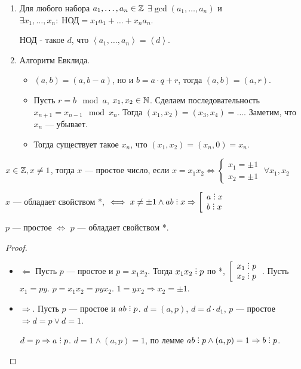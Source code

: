 \begin{enumerate}
    \item Для любого набора $a_1, \ldots, a_n \in \mathbb{Z}$ $\exists \gcd(a_1,\ldots,a_n)$ и $\exists x_1,\ldots,x_n: \; \text{НОД} = x_1a_1 + \ldots + x_n a_n$. 

        НОД - такое $d$, что  $\left< a_1,\ldots,a_n \right> = \left<d\right>$.
    \item Алгоритм Евклида. 
        \begin{itemize}
            \item $(a, b) = (a, b - a)$, но и  $b = a \cdot q + r$, тогда  $(a, b) = (a, r)$.
            
            \item Пусть $r = b \mod a$,  $x_1,x_2 \in \mathbb{N}$. Сделаем последовательность $x_{n+1} = x_{n - 1} \mod x_{n}$. Тогда  $(x_1, x_2) = (x_3, x_4) = \ldots$. Заметим, что $x_n$ --- убывает.

            \item Тогда существует такое  $x_n$, что  $(x_1, x_2) = (x_n, 0) = x_n$.
        \end{itemize}
\end{enumerate}
\begin{definition}
    $x \in \mathbb{Z}, x \neq 1$, тогда  $x$ --- простое число, если $x = x_1x_2 \iff \begin{cases} x_1 = \pm 1 \\ x_2 = \pm 1 \end{cases} \; \forall x_1, x_2$
\end{definition}
\begin{property}[*]
    $x$ --- обладает свойством  *, $\iff x \neq \pm 1 \land ab \divby x \Rightarrow \left[ \begin{array}{l} a \divby x \\ b \divby x \end{array} \right.$ 
\end{property}
\begin{statement}
    $p$ --- простое  $\iff$ $p$ --- обладает свойством *. \\
\end{statement}
\begin{proof}
     \begin{itemize}
         \item $\Leftarrow$ Пусть $p$ --- простое и  $p = x_1x_2$. Тогда $x_1x_2 \divby p$ по *, $\left[ \begin{array}{l} x_1 \divby p \\ x_2 \divby p \end{array} \right.$. Пусть $x_1 = py$. $p = x_1x_2 = pyx_2$. $1 = yx_2 \Rightarrow x_2 = \pm 1$.
             \item $\Rightarrow$. Пусть  $p$ --- простое и  $ab \divby p$.  $d = (a, p)$,  $d = d \cdot d_1$, $p$ --- простое  $\Rightarrow d = p \lor d = 1$.

                 $d = p \Rightarrow a \divby p$. $d = 1 \land (a, p) = 1$, по лемме  $ab \divby p \land (a,p) = 1 \Rightarrow b \divby p$.
     \end{itemize}
\end{proof}
